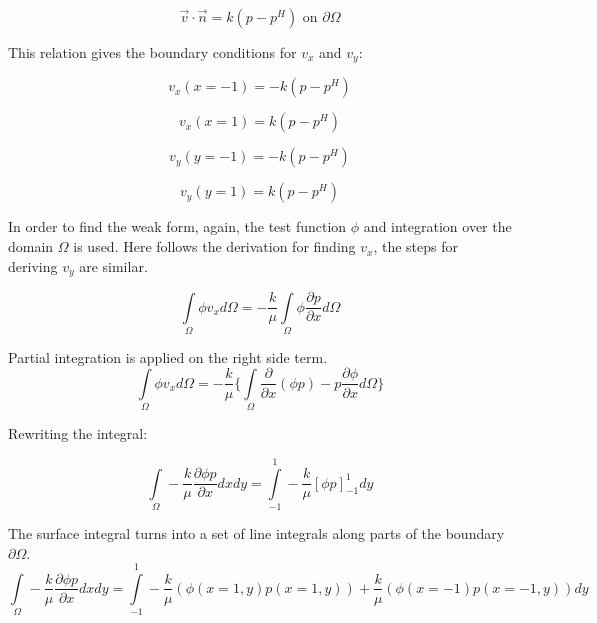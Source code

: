 \documentclass[a4paper]{report}
\begin{document}
\begin{equation}
\vec{v}\cdot\vec{n}=k(p-p^H)\text{ on }\partial\Omega
\end{equation}

This relation gives the boundary conditions for $v_x$ and $v_y$:

\begin{equation}
v_x(x=-1)=-k(p-p^H)
\end{equation}


\begin{equation}
v_x(x=1)=k(p-p^H)
\end{equation}


\begin{equation}
v_y(y=-1)=-k(p-p^H)
\end{equation}


\begin{equation}
v_y(y=1)=k(p-p^H)
\end{equation}

%
%
In order to find the weak form, again, the test function $\phi$ and integration over the domain $\Omega$ is used. Here follows the derivation for finding $v_x$, the steps for deriving $v_y$ are similar.

\begin{equation}
\int\limits_{\Omega}\phi v_x d\Omega=-\frac{k}{\mu}\int\limits_{\Omega}\phi\frac{\partial p}{\partial x}d\Omega
\end{equation}

Partial integration is applied on the right side term.
\begin{equation}
\int\limits_{\Omega}\phi v_x d\Omega=  -\frac{k}{\mu}\{\int\limits_{\Omega}\frac{\partial }{\partial x}(\phi p)-p\frac{\partial \phi}{\partial x}d\Omega\}
\end{equation}

Rewriting the integral:

\begin{equation}
 \int\limits_{\Omega}-\frac{k}{\mu}\frac{\partial \phi p}{\partial x}dxdy=\int\limits_{-1}^{1}-\frac{k}{\mu}[\phi p]^{1}_{-1}dy
\end{equation}

The surface integral turns into a set of line integrals along parts of the boundary $\partial\Omega$.
\begin{equation}
\int\limits_{\Omega}-\frac{k}{\mu}\frac{\partial \phi p}{\partial x}dxdy=  \int\limits_{-1}^{1}-\frac{k}{\mu}(\phi(x=1,y)p(x=1,y))+\frac{k}{\mu}(\phi(x=-1)p(x=-1,y))dy
\end{equation}
\end{document}
